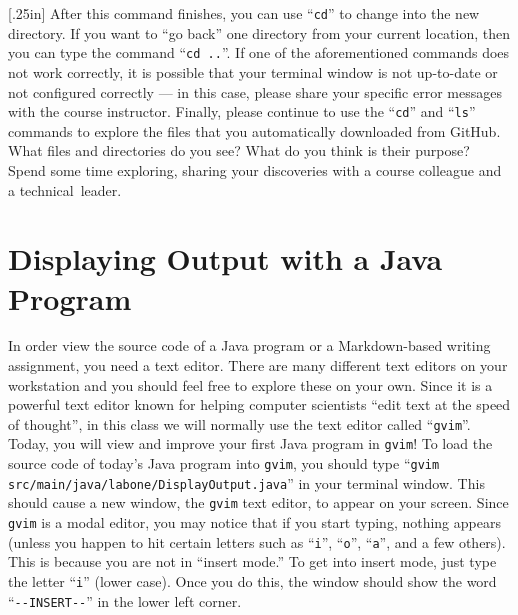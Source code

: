 \documentclass[11pt]{article}
\newcommand{\command}[1]{``\lstinline{#1}''}
\newcommand{\program}[1]{\lstinline{#1}}
\newcommand{\step}[1]{``{#1}''}
\newcommand{\discuss}[1]{\null\hfill\LARGE{\faCommentO{}}\newline\scriptsize{\em{#1}}}
\begin{document}
\marginnote{\discuss{Use terminal commands}}[.25in] After this command finishes,
you can use \command{cd} to change into the new directory. If you want to
\step{go back} one directory from your current location, then you can type the
command \command{cd ..}. If one of the aforementioned commands does not work
correctly, it is possible that your terminal window is not up-to-date or not
configured correctly --- in this case, please share your specific error messages
with the course instructor. Finally, please continue to use the \command{cd} and
\command{ls} commands to explore the files that you automatically downloaded
from GitHub. What files and directories do you see? What do you think is their
purpose? Spend some time exploring, sharing your discoveries with a course
colleague and a \mbox{technical leader}.

\section*{Displaying Output with a Java Program}

In order view the source code of a Java program or a Markdown-based writing
assignment, you need a text editor. There are many different text editors on
your workstation and you should feel free to explore these on your own. Since
it is a powerful text editor known for helping computer scientists ``edit text
at the speed of thought'', in this class we will normally use the text editor
called \command{gvim}. Today, you will view and improve your first Java program
in {\tt gvim}! To load the source code of today's Java program into
\program{gvim}, you should type \command{gvim
src/main/java/labone/DisplayOutput.java} in your terminal window. This should
cause a new window, the \program{gvim} text editor, to appear on your screen.
Since \program{gvim} is a modal editor, you may notice that if you start
typing, nothing appears (unless you happen to hit certain letters such as
\command{i}, \command{o}, \command{a}, and a few others). This is because you
are not in ``insert mode.'' To get into insert mode, just type the letter
\command{i} (lower case). Once you do this, the window should show the word
\command{--INSERT--} in the lower left corner.
\end{document}
